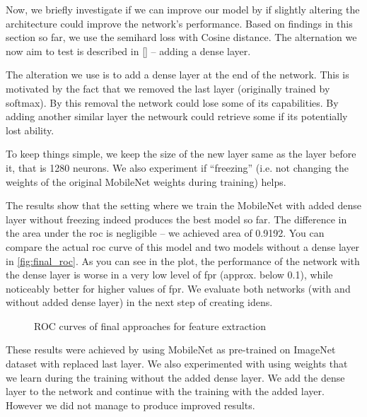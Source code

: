 Now, we briefly investigate if we can improve our model by if slightly altering the architecture could improve the network's performance. Based on findings in this section so far, we use the semihard loss with Cosine distance. The alternation we now aim to test is described in \ref{} -- adding a dense layer.

{\color{red}
The alteration we use is to add a dense layer at the end of the network. This is motivated by the fact that we removed the last layer (originally trained by softmax). By this removal the network could lose some of its capabilities. By adding another similar layer the netwourk could retrieve some if its potentially lost ability. 

To keep things simple, we keep the size of the new layer same as the layer before it, that is 1280 neurons. We also experiment if ``freezing'' (i.e. not changing the weights of the original MobileNet weights during training) helps.
}

The results show that the setting where we train the MobileNet with added dense layer without freezing indeed produces the best model so far. The difference in the area under the \gls{roc} is negligible -- we achieved area of 0.9192. You can compare the actual \gls{roc} curve of this model and two models without a dense layer in \autoref{fig:final_roc}. As you can see in the plot, the performance of the network with the dense layer is worse in a very low level of \gls{fpr} (approx. below 0.1), while noticeably better for higher values of \gls{fpr}. We evaluate both networks (with and without added dense layer) in the next step of creating \glspl{iden}.


\begin{figure}
    \centering
    \def\svgwidth{\columnwidth}
    
    \caption{ROC curves of final approaches for feature extraction}
    \label{fig:final_roc}
\end{figure}

These results were achieved by using MobileNet as pre-trained on ImageNet dataset with replaced last layer. We also experimented with using weights that we learn during the training without the added dense layer. We add the dense layer to the network and continue with the training with the added layer. However we did not manage to produce improved results. 



